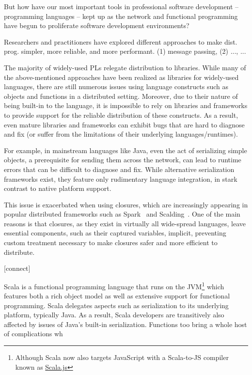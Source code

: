 
But how have our most important tools in professional software development --
programming languages -- kept up as the network and functional programming have
begun to proliferate software development environments?

Researchers and practitioners have explored different approaches to make dist.
prog. simpler, more reliable, and more performant. (1) message passing, (2) ..., ...

The majority of widely-used PLs relegate distribution to libraries. While many
of the above-mentioned approaches have been realized as libraries for
widely-used languages, there are still numerous issues using language constructs
such as objects and functions in a distributed setting. Moreover, due to their
nature of being built-in to the language, it is impossible to rely on libraries
and frameworks to provide support for the reliable distribution of these
constructs. As a result, even mature libraries and frameworks can exhibit bugs
that are hard to diagnose and fix (or suffer from the limitations of their
underlying languages/runtimes).

For example, in mainstream languages like Java, even the act of serializing
simple objects, a prerequisite for sending them across the network, can lead to
runtime errors that can be difficult to diagnose and fix. While alternative
serialization frameworks exist, they feature only rudimentary language
integration, in stark contrast to native platform support.

This issue is exacerbated when using closures, which are increasingly appearing
in popular distributed frameworks such as Spark~\cite{Spark} and
Scalding~\cite{Scalding}. One of the main reasons is that closures, as they
exist in virtually all wide-spread languages, leave essential components, such
as their captured variables, implicit, preventing custom treatment necessary to
make closures safer and more efficient to distribute.

[connect]

Scala is a functional programming language that runs on the
JVM\footnote{Although Scala now also targets JavaScript with a Scala-to-JS
compiler known as \href{http://www.scala-js.org/}{Scala.js}} which features both a rich object model as well as extensive support for functional programming.
Scala delegates aspects such as serialization to its underlying platform, typically Java. As a result, Scala developers are transitively also affected by issues of Java's built-in serialization. Functions too bring a whole host of complications wh

